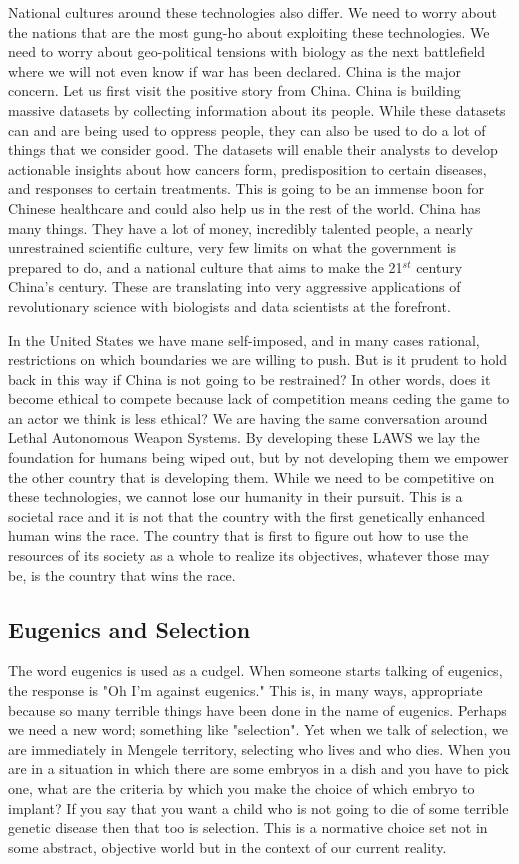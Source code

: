 National cultures around these technologies also differ.
We need to worry about the nations that are the most gung-ho about exploiting these technologies.
We need to worry about geo-political tensions with biology as the next battlefield where we will not even know if war has been declared.
China is the major concern.
Let us first visit the positive story from China.
China is building massive datasets by collecting information about its people.
While these datasets can and are being used to oppress people, they can also be used to do a lot of things that we consider good.
The datasets will enable their analysts to develop actionable insights about how cancers form, predisposition to certain diseases, and responses to certain treatments.
This is going to be an immense boon for Chinese healthcare and could also help us in the rest of the world.
China has many things.
They have a lot of money, incredibly talented people, a nearly unrestrained scientific culture, very few limits on what the government is prepared to do, and a national culture that aims to make the 21$^{st}$ century China's century.
These are translating into very aggressive applications of revolutionary science with biologists and data scientists at the forefront.

In the United States we have mane self-imposed, and in many cases rational, restrictions on which boundaries we are willing to push.
But is it prudent to hold back in this way if China is not going to be restrained?
In other words, does it become ethical to compete because lack of competition means ceding the game to an actor we think is less ethical?
We are having the same conversation around Lethal Autonomous Weapon Systems.
By developing these LAWS we lay the foundation for humans being wiped out, but by not developing them we empower the other country that is developing them.
While we need to be competitive on these technologies, we cannot lose our humanity in their pursuit.
This is a societal race and it is not that the country with the first genetically enhanced human wins the race.
The country that is first to figure out how to use the resources of its society as a whole to realize its objectives, whatever those may be, is the country that wins the race.

\subsection{Eugenics and Selection}

The word eugenics is used as a cudgel.
When someone starts talking of eugenics, the response is "Oh I'm against eugenics."
This is, in many ways, appropriate because so many terrible things have been done in the name of eugenics.
Perhaps we need a new word; something like "selection".
Yet when we talk of selection, we are immediately in Mengele territory, selecting who lives and who dies.
When you are in a situation in which there are some embryos in a dish and you have to pick one, what are the criteria by which you make the choice of which embryo to implant?
If you say that you want a child who is not going to die of some terrible genetic disease then that too is selection.
This is a normative choice set not in some abstract, objective world but in the context of our current reality.

